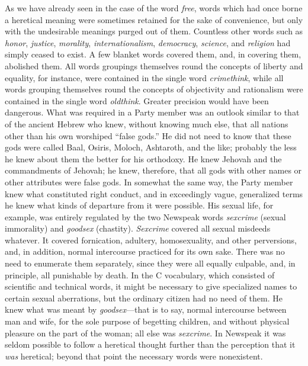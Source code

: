 \begin{paracol}{2}
\switchcolumn*

As we have already seen in the case of the word \emph{free}, words which
had once borne a heretical meaning were sometimes retained for the sake
of convenience, but only with the undesirable meanings purged out of
them. Countless other words such as \emph{honor}, \emph{justice},
\emph{morality}, \emph{internationalism}, \emph{democracy},
\emph{science}, and \emph{religion} had simply ceased to exist. A few
blanket words covered them, and, in covering them, abolished them. All
words groupings themselves round the concepts of liberty and equality,
for instance, were contained in the single word \emph{crimethink}, while
all words grouping themselves round the concepts of objectivity and
rationalism were contained in the single word \emph{oldthink}. Greater
precision would have been dangerous. What was required in a Party member
was an outlook similar to that of the ancient Hebrew who knew, without
knowing much else, that all nations other than his own worshiped ``false
gods.'' He did not need to know that these gods were called Baal, Osiris,
Moloch, Ashtaroth, and the like; probably the less he knew about them
the better for his orthodoxy. He knew Jehovah and the commandments of
Jehovah; he knew, therefore, that all gods with other names or other
attributes were false gods. In somewhat the same way, the Party member
knew what constituted right conduct, and in exceedingly vague,
generalized terms he knew what kinds of departure from it were possible.
His sexual life, for example, was entirely regulated by the two Newspeak
words \emph{sexcrime} (sexual immorality) and \emph{goodsex} (chastity).
\emph{Sexcrime} covered all sexual misdeeds whatever. It covered
fornication, adultery, homosexuality, and other perversions, and, in
addition, normal intercourse practiced for its own sake. There was no
need to enumerate them separately, since they were all equally culpable,
and, in principle, all punishable by death. In the C vocabulary, which
consisted of scientific and technical words, it might be necessary to
give specialized names to certain sexual aberrations, but the ordinary
citizen had no need of them. He knew what was meant by
\emph{goodsex}---that is to say, normal intercourse between man and
wife, for the sole purpose of begetting children, and without physical
pleasure on the part of the woman; all else was \emph{sexcrime}. In
Newspeak it was seldom possible to follow a heretical thought further
than the perception that it \emph{was} heretical; beyond that point the
necessary words were nonexistent.


\end{paracol}
